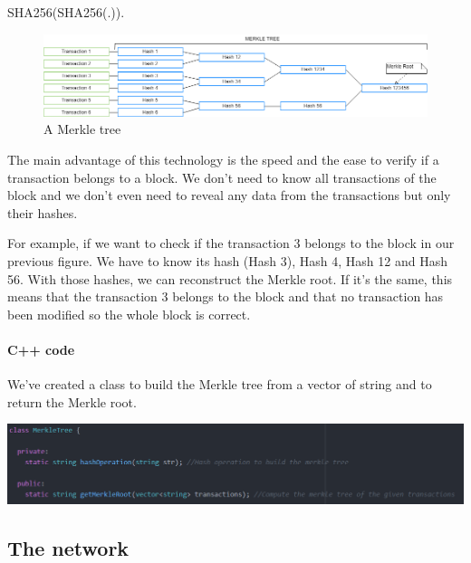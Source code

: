   SHA256(SHA256(.)).

  \begin{figure}[ht]
  \centering
  \includegraphics[width=\textwidth]{Figures/merkleTree}
  \caption{A Merkle tree}
  \end{figure}
  \medskip

  The main advantage of this technology is the speed and the ease to verify if a transaction belongs to a block. We don't need to know all transactions of the block and we don't even need to reveal any data from the transactions but only their hashes. \newline

  For example, if we want to check if the transaction 3 belongs to the block in our previous figure. We have to know its hash (Hash 3), Hash 4, Hash 12 and Hash 56. With those hashes, we can reconstruct the Merkle root. If it's the same, this means that the transaction 3 belongs to the block and that no transaction has been modified so the whole block is correct.


  \begin{aside}

  \paragraph{C++ code}

  We've created a class to build the Merkle tree from a vector of string and to return the Merkle root. \newline

  \includegraphics[width=14cm]{Figures/ClassMerkleTree}

  \end{aside}
  \medskip

  \subsection{The network}

